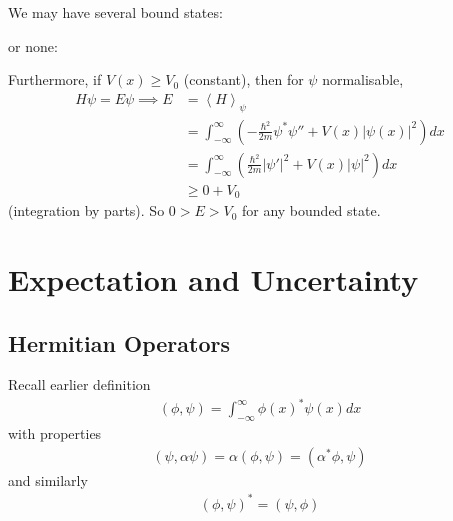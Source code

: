 \documentclass[a4paper]{article}
\begin{document}
We may have several bound states:


or none:


Furthermore, if $V\left(x\right) \geq V_0$ (constant), then for $\psi$ normalisable,
\begin{equation*}
\begin{aligned}
H\psi = E\psi \implies E &= \left<H\right>_\psi\\
&=\int_{-\infty}^\infty \left(-\frac{\hbar^2}{2m} \psi^* \psi'' + V\left(x\right) |\psi\left(x\right)|^2\right) dx\\
&= \int_{-\infty}^\infty \left(\frac{\hbar^2}{2m}|\psi'|^2 + V\left(x\right) |\psi|^2\right) dx\\
&\geq 0+V_0
\end{aligned}
\end{equation*}
(integration by parts). So $0>E>V_0$ for any bounded state.

\newpage

\section{Expectation and Uncertainty}
\subsection{Hermitian Operators}
Recall earlier definition
\begin{equation*}
\begin{aligned}
\left(\phi,\psi\right) = \int_{-\infty}^\infty \phi\left(x\right)^* \psi\left(x\right) dx
\end{aligned}
\end{equation*}
with properties
\begin{equation*}
\begin{aligned}
\left(\psi,\alpha\psi\right)=\alpha\left(\phi,\psi\right) = \left(\alpha^*\phi,\psi\right)
\end{aligned}
\end{equation*}
and similarly
\begin{equation*}
\begin{aligned}
\left(\phi,\psi\right)^* = \left(\psi,\phi\right)
\end{aligned}
\end{equation*}
\end{document}
